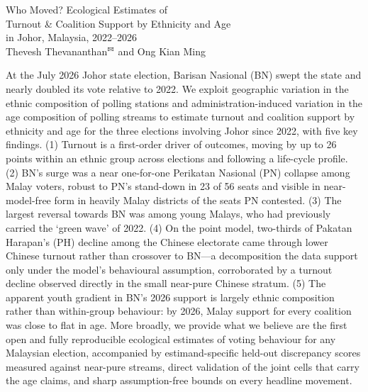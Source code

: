 \documentclass[11pt]{article}
\begin{document}

\begin{center}
	\begin{minipage}{0.9\linewidth}
		\begin{center}
			\LARGE
			Who Moved? Ecological Estimates of \\Turnout \& Coalition Support by Ethnicity and Age\\in Johor, Malaysia, 2022--2026\\[0.21in]
			\Large
			Thevesh Thevananthan\footnotemark$^{\text{\Letter}}$ and Ong Kian Ming\footnotemark\\[0.15in]
		\end{center}
		\large
		At the July 2026 Johor state election, Barisan Nasional (BN) swept the state and nearly doubled its vote relative to 2022. We exploit geographic variation in the ethnic composition of polling stations and administration-induced variation in the age composition of polling streams to estimate turnout and coalition support by ethnicity and age for the three elections involving Johor since 2022, with five key findings. (1) Turnout is a first-order driver of outcomes, moving by up to 26 points within an ethnic group across elections and following a life-cycle profile. (2) BN's surge was a near one-for-one Perikatan Nasional (PN) collapse among Malay voters, robust to PN's stand-down in 23 of 56 seats and visible in near-model-free form in heavily Malay districts of the seats PN contested. (3) The largest reversal towards BN was among young Malays, who had previously carried the `green wave' of 2022. (4) On the point model, two-thirds of Pakatan Harapan's (PH) decline among the Chinese electorate came through lower Chinese turnout rather than crossover to BN---a decomposition the data support only under the model's behavioural assumption, corroborated by a turnout decline observed directly in the small near-pure Chinese stratum. (5) The apparent youth gradient in BN's 2026 support is largely ethnic composition rather than within-group behaviour: by 2026, Malay support for every coalition was close to flat in age. More broadly, we provide what we believe are the first open and fully reproducible ecological estimates of voting behaviour for any Malaysian election, accompanied by estimand-specific held-out discrepancy scores measured against near-pure streams, direct validation of the joint cells that carry the age claims, and sharp assumption-free bounds on every headline movement.
	\end{minipage}
\end{center}
\end{document}
